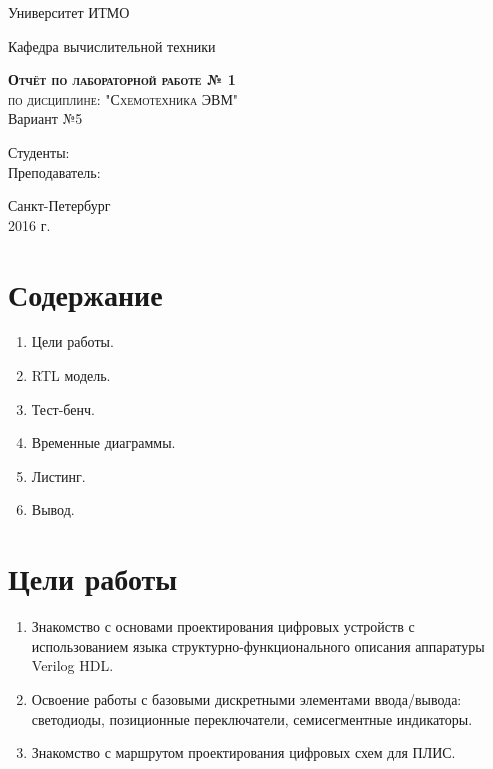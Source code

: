\documentclass[a4paper, 10pt]{article}
\begin{document}
    \begin{titlepage}
        \begin{center}
            \large
            Университет ИТМО
            \vspace{3cm}


            Кафедра вычислительной техники
            \vspace{4cm}

            \textsc{ \textbf{Отчёт по лабораторной работе  № 1} \\ по дисциплине: "Схемотехника ЭВМ"}\\Вариант №5\\[8mm]

            \bigskip
        \end{center}
        \vspace{3cm}

        \hfill\begin{flushright}
             Студенты: \\
             \vfill
             Преподаватель: \\
        \end{flushright}
        \vfill
        \vfill
        \vfill
        \vfill
        \vfill
        \begin{center}
            Санкт-Петербург \\2016 г.
        \end{center}
    \end{titlepage}
   \newpage
    \section*{Содержание}
        \begin{enumerate}
            \item Цели работы.
            \item RTL модель.
            \item Тест-бенч.
            \item Временные диаграммы.
            \item Листинг.
            \item Вывод.
        \end{enumerate}

    \section*{Цели работы}

        \begin{enumerate}
            \item Знакомство с основами проектирования цифровых устройств с использованием языка структурно-функционального описания аппаратуры Verilog HDL.
            \item Освоение работы с базовыми дискретными элементами ввода/вывода: светодиоды, позиционные переключатели, семисегментные индикаторы. 
            \item  Знакомство с маршрутом проектирования цифровых схем для ПЛИС. 
        \end{enumerate} 
\end{document}
